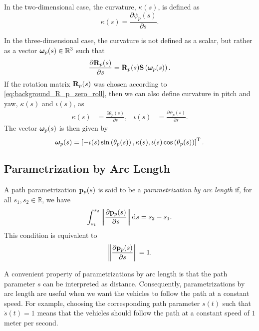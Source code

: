 In the two-dimensional case, the curvature, $\kappa(s)$, is defined as
\begin{equation}
    \kappa(s) = \frac{\partial \psi_{p}(s)}{\partial s}.
\end{equation}

In the three-dimensional case, the curvature is not defined as a scalar, but rather as a vector $\bm{\omega}_p(s) \in \mathbb{R}^3$ such that
\begin{equation}
    \frac{\partial \mathbf{R}_p(s)}{\partial s} = \mathbf{R}_p(s) \mathbf{S}\left(\bm{\omega}_p(s)\right).
    \label{eq:background_omega_p}
\end{equation}
If the rotation matrix $\mathbf{R}_p(s)$ was chosen according to \eqref{eq:background_R_p_zero_roll}, then we can also define curvature in pitch and yaw, $\kappa(s)$ and $\iota(s)$, as
\begin{align}
    \kappa(s) &= \frac{\partial \theta_{p}(s)}{\partial s}, &
    \iota(s) &= \frac{\partial \psi_{p}(s)}{\partial s}.
\end{align}
The vector $\bm{\omega}_p(s)$ is then given by
\begin{equation}
    \bm{\omega}_p(s) = \left[-\iota(s)\sin\left(\theta_{p}(s)\right), \kappa(s), \iota(s)\cos\left(\theta_{p}(s)\right)\right]^{\mathrm{T}}.
\end{equation}

\subsection{Parametrization by Arc Length}
A path parametrization $\mathbf{p}_p(s)$ is said to be a \emph{parametrization by arc length} if, for all $s_1, s_2 \in \mathbb{R}$, we have
\begin{equation}
    \int_{s_1}^{s_2} \left\|\frac{\partial \mathbf{p}_p(s)}{\partial s}\right\| {\rm d}s = s_2 - s_1.
\end{equation}
This condition is equivalent to
\begin{equation}
    \left\|\frac{\partial \mathbf{p}_p(s)}{\partial s}\right\| = 1.
\end{equation}

A convenient property of parametrizations by arc length is that the path parameter $s$ can be interpreted as distance.
Consequently, parametrizations by arc length are useful when we want the vehicles to follow the path at a constant speed.
For example, choosing the corresponding path parameter $s(t)$ such that $\dot{s}(t) = 1$ means that the vehicles should follow the path at a constant speed of $1$ meter per second.

